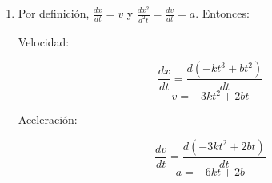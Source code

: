 \begin{enumerate}

\item

Por definici\'on, $\frac{dx}{dt} = v$ y $\frac{dx^2}{d^2t} = \frac{dv}{dt} = a$. Entonces:

Velocidad:

$$
\frac{dx}{dt} = \frac{d(-kt^3 + bt^2)}{dt}
$$
$$
v = -3kt^2 + 2bt
$$

Aceleraci\'on:

$$
\frac{dv}{dt} = \frac{d(-3kt^2 + 2bt)}{dt}
$$
$$
a = -6kt + 2b
$$


\end{enumerate}